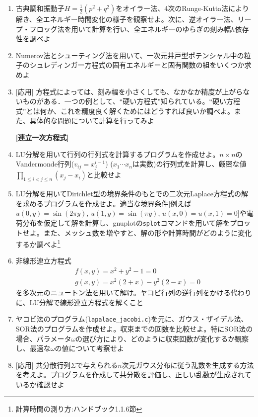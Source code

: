 \documentclass[11pt]{jarticle}
\begin{document}
\begin{enumerate}
\item 古典調和振動子$H=\frac{1}{2}(p^2+q^2)$をオイラー法、4次のRunge-Kutta法により解き、全エネルギー時間変化の様子を観察せよ。次に、逆オイラー法、リープ・フロッグ法を用いて計算を行い、全エネルギーのゆらぎの刻み幅$h$依存性を調べよ

\item Numerov法とシューティング法を用いて、一次元井戸型ポテンシャル中の粒子のシュレディンガー方程式の固有エネルギーと固有関数の組をいくつか求めよ
  
\item \mbox{} [応用] 方程式によっては、刻み幅を小さくしても、なかなか精度が上がらないものがある．一つの例として、``硬い方程式''知られている。``硬い方程式''とは何か、これを精度良く解くためにはどうすれば良いか調べよ。また、具体的な問題について計算を行ってみよ

  \hspace*{-2em} {\bf [連立一次方程式]}

\item LU分解を用いて行列の行列式を計算するプログラムを作成せよ。$n \times n$のVandermonde行列($v_{ij}=x_j^{i-1}$) ($x_1 \cdots x_n$は実数)の行列式を計算し、厳密な値$\displaystyle \prod_{1 \le i < j \le n} (x_j-x_i)$と比較せよ
  
\item LU分解を用いてDirichlet型の境界条件のもとでの二次元Laplace方程式の解を求めるプログラムを作成せよ。適当な境界条件[例えば$u(0,y) = \sin(2 \pi y)$, $u(1,y) = \sin(\pi y)$, $u(x,0)=u(x,1)=0$]や電荷分布を仮定して解を計算し、gnuplotの{\tt splot}コマンドを用いて解をプロットせよ。また、メッシュ数を増やすと、解の形や計算時間がどのように変化するか調べよ\footnote{計算時間の測り方:ハンドブック1.1.6節}

\item 非線形連立方程式
  \begin{align*}
    & f(x,y) = x^2 + y^2 - 1 = 0 \\
    & g(x,y) = x^2(2+x) - y^2 (2-x) = 0
  \end{align*}
  を多次元のニュートン法を用いて解け。ヤコビ行列の逆行列をかける代わりに、LU分解で線形連立方程式を解くこと

\item ヤコビ法のプログラム({\tt lapalace\_jacobi.c})を元に、ガウス・ザイデル法、SOR法のプログラムを作成せよ。収束までの回数を比較せよ。特にSOR法の場合、パラメータ$\omega$の選び方により、どのように収束回数が変化するか観察し、最適な$\omega$の値について考察せよ

\item \mbox{} [応用] 共分散行列$\Sigma$で与えられる$n$次元ガウス分布に従う乱数を生成する方法を考えよ。プログラムを作成して共分散を評価し、正しい乱数が生成されているか確認せよ


\end{enumerate}
\end{document}
